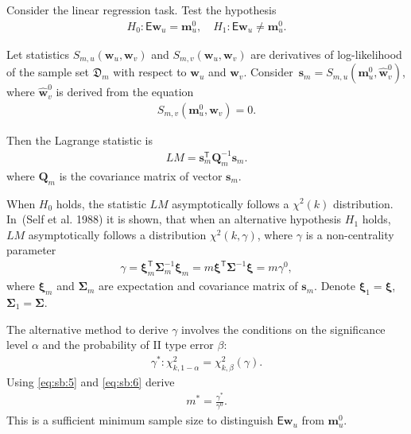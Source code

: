 \documentclass[
11pt,%
tightenlines,%
twoside,%
onecolumn,%
nofloats,%
nobibnotes,%
nofootinbib,%
superscriptaddress,%
noshowpacs,%
centertags]%
{revtex4}
\begin{document}
Consider the linear regression task. Test the hypothesis
\[
\label{eq:sb:2}
\begin{aligned}
	H_0: \mathsf{E}\textbf{w}_{u} = \textbf{m}^0_{u}, \quad H_1: \mathsf{E}\textbf{w}_{u} \not= \textbf{m}^0_{u}.
\end{aligned}
\]

Let statistics $S_{m,u}\left(\textbf{w}_{u}, \textbf{w}_{v}\right)$ and $S_{m,v}\left(\textbf{w}_{u}, \textbf{w}_{v}\right)$ are derivatives of log-likelihood of the sample set $\mathfrak{D}_{m}$ with respect to $\textbf{w}_{u}$ and $\textbf{w}_{v}$.
Consider~$\textbf{s}_{m} = S_{m,u}\left(\textbf{m}^{0}_{u}, \hat{\textbf{w}}^{0}_{v}\right)$, where $\hat{\textbf{w}}^{0}_{v}$ is derived from the equation
\[
\label{eq:sb:3}
\begin{aligned}
	S_{m,v}\left(\textbf{m}^{0}_{u}, \textbf{w}_{v}\right) = 0.
\end{aligned}
\]

Then the Lagrange statistic is
\[
\label{eq:sb:4}
\begin{aligned}
	LM = \textbf{s}^{\mathsf{T}}_{m}\textbf{Q}_{m}^{-1}\textbf{s}_{m}.
\end{aligned}
\]
where $\textbf{Q}_{m}$ is the covariance matrix of vector $\textbf{s}_{m}$.
	
When $H_0$ holds, the statistic $LM$ asymptotically follows a $\chi^2(k)$ distribution.  In~(Self et al. 1988) it is shown, that when an alternative hypothesis $H_1$ holds,  $LM$ asymptotically follows a distribution $\chi^2(k,\gamma)$, where $\gamma$ is a non-centrality parameter
\[
\label{eq:sb:5}
\begin{aligned}
	\gamma = \bm{\xi}_{m}^{\mathsf{T}}\bm{\Sigma}^{-1}_{m}\bm{\xi}_{m} = m\bm{\xi}^{\mathsf{T}}\bm{\Sigma}^{-1}\bm{\xi}= m\gamma^0,
\end{aligned}
\]
where $\bm{\xi}_{m}$ and $\bm{\Sigma}_{m}$ are expectation and covariance matrix of $\textbf{s}_{m}$. Denote $\bm{\xi}_1 = \bm{\xi}$,  $\bm{\Sigma}_1 = \bm{\Sigma}$. 
	
The alternative method to derive $\gamma$ involves the conditions on the significance level $\alpha$ and the probability of II type error $\beta$:
\[
\label{eq:sb:6}
\begin{aligned}
	\gamma^*:\chi^2_{k, 1-\alpha} = \chi^2_{k, \beta}\left(\gamma\right).
\end{aligned}
\]
Using \eqref{eq:sb:5} and \eqref{eq:sb:6} derive
\[
\label{eq:sb:7}
\begin{aligned}
	m^* = \frac{\gamma^*}{\gamma^0}.
\end{aligned}
\]
This is a sufficient minimum sample size to distinguish $\mathsf{E}\textbf{w}_{u}$ from $\textbf{m}^0_{u}$.
\end{document}
